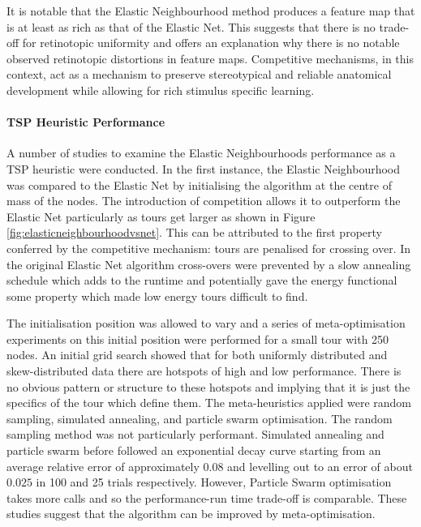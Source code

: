 It is notable that the Elastic Neighbourhood method produces a feature map that is at least as rich as that of the Elastic Net. This suggests that there is no trade-off for retinotopic uniformity and offers an explanation why there is no notable observed retinotopic distortions in feature maps. Competitive mechanisms, in this context, act as a mechanism to preserve stereotypical and reliable anatomical development while allowing for rich stimulus specific learning.
\paragraph{TSP Heuristic Performance}
A number of studies to examine the Elastic Neighbourhoods performance as a TSP heuristic were conducted. In the first instance, the Elastic Neighbourhood was compared to the Elastic Net by initialising the algorithm at the centre of mass of the nodes. The introduction of competition allows it to outperform the Elastic Net particularly as tours get larger as shown in Figure \ref{fig:elasticneighbourhoodvsnet}. This can be attributed to the first property conferred by the competitive mechanism: tours are penalised for crossing over. In the original Elastic Net algorithm cross-overs were prevented by a slow annealing schedule which adds to the runtime and potentially gave the energy functional some property which made low energy tours difficult to find.

The initialisation position was allowed to vary and a series of meta-optimisation experiments on this initial position were performed for a small tour with 250 nodes. An initial grid search showed that for both uniformly distributed and skew-distributed data there are hotspots of high and low performance. There is no obvious pattern or structure to these hotspots and implying that it is just the specifics of the tour which define them. The meta-heuristics applied were random sampling, simulated annealing, and particle swarm optimisation. The random sampling method was not particularly performant. Simulated annealing and particle swarm before followed an exponential decay curve starting from an average relative error of approximately $0.08$ and levelling out to an error of about $0.025$ in 100 and 25 trials respectively. However, Particle Swarm optimisation takes more calls and so the performance-run time trade-off is comparable. These studies suggest that the algorithm can be improved by meta-optimisation.

